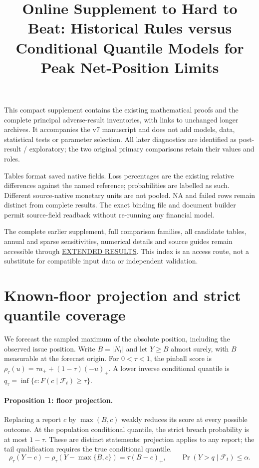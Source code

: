 \documentclass[11pt,a4paper]{article}
\title{Online Supplement to Hard to Beat: Historical Rules versus Conditional Quantile Models for Peak Net-Position Limits}
\author{}
\date{}
\begin{document}
\maketitle
This compact supplement contains the existing mathematical proofs and the
complete principal adverse-result inventories, with links to unchanged longer
archives. It accompanies the v7 manuscript and does not add models, data,
statistical tests or parameter selection. All later diagnostics are identified
as post-result / exploratory; the two original primary comparisons retain
their values and roles.

Tables format saved native fields. Loss percentages are the existing relative
differences against the named reference; probabilities are labelled as such.
Different source-native monetary units are not pooled. NA and failed rows
remain distinct from complete results. The exact binding file and document
builder permit source-field readback without re-running any financial model.

The complete earlier supplement, full comparison families, all candidate
tables, annual and sparse sensitivities, numerical details and source guides
remain accessible through \href{https://github.com/ByronLi0207/financial-mathematics-paper-20261020/blob/revision-v7-final/EXTENDED_RESULTS.md}{EXTENDED RESULTS}.
This index is an access route, not a substitute for compatible input data or
independent validation.
\section{Known-floor projection and strict quantile coverage}\label{sup:floor}

We forecast the sampled maximum of the absolute position, including
the observed issue position. Write \(B=|N_t|\) and let \(Y\ge B\) almost surely,
with \(B\) measurable at the forecast origin. For \(0<\tau<1\), the pinball score is
\(\rho_\tau(u)=\tau u_+ +(1-\tau)(-u)_+\). A lower inverse conditional quantile
is \(q_\tau=\inf\{c:F(c\mid\mathcal F_t)\ge\tau\}\).

\paragraph{Proposition 1: floor projection.}
Replacing a report \(c\) by \(\max(B,c)\) weakly reduces its score at every possible
outcome. At the population conditional quantile, the strict breach probability
is at most \(1-\tau\). These are distinct statements: projection applies to any
report; the tail qualification requires the true conditional quantile.
\[
\rho_\tau(Y-c)-\rho_\tau(Y-\max\{B,c\})=\tau(B-c)_+,\qquad \Pr(Y>q\mid\mathcal F_t)\le\alpha.
\]
\end{document}
